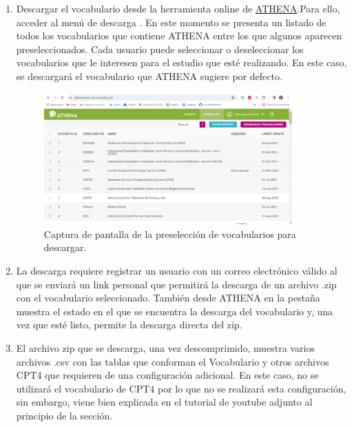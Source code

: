 \begin{enumerate}

    \item Descargar el vocabulario desde la herramienta online de  \href{https://athena.ohdsi.org/}{ATHENA}.Para ello, acceder al menú de descarga . En este momento se presenta un listado de todos los vocabularios que contiene ATHENA entre los que algunos aparecen preseleccionados. Cada usuario puede seleccionar o deseleccionar los vocabularios que le interesen para el estudio que esté realizando. En este caso, se descargará el vocabulario que ATHENA sugiere por defecto.
    
    \begin{figure}[H]
        \centering
        \includegraphics[width=0.90\textwidth]{figures/athenaPreDownload.png}
        \caption{Captura de pantalla de la preselección de vocabularios para descargar.}
        \label{fig:athenaPreDownload}
    \end{figure}

    \item La descarga requiere registrar un usuario con un correo electrónico válido al que se enviará un link personal que permitirá la descarga de un archivo .zip con el vocabulario seleccionado. También desde ATHENA en la pestaña  muestra el estado en el que se encuentra la descarga del vocabulario y, una vez que esté listo, permite la descarga directa del zip.

    \item El archivo zip que se descarga, una vez descomprimido, muestra varios archivos .csv con las tablas que conforman el Vocabulario y otros archivos CPT4 que requieren de una configuración adicional. En este caso, no se utilizará el vocabulario de CPT4 por lo que no se realizará esta configuración, sin embargo, viene bien explicada en el tutorial de youtube adjunto al principio de la sección.


\end{enumerate}
